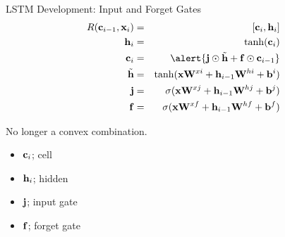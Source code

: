 \documentclass{beamer}
\begin{document}
\begin{frame}{LSTM Development: Input and Forget Gates}
    \begin{eqnarray*}
      R(\boldc_{i-1}, \boldx_i) &=& [\boldc_i, \boldh_i]  \\
      \boldh_i &=& \tanh(\boldc_i) \\ 
      \boldc_i &=& \alert{\boldj \odot \tilde{\boldh}  + \boldf \odot \bold c_{i-1} } \\
      \tilde{\boldh} &=& \tanh(\boldx \boldW^{xi} + \boldh_{i-1}\boldW^{hi} + \boldb^i) \\
      \boldj &=& \sigma(\boldx \boldW^{xj} + \boldh_{i-1}\boldW^{hj} + \boldb^j) \\
      \boldf &=& \sigma(\boldx \boldW^{xf} + \boldh_{i-1}\boldW^{hf} + \boldb^f) \\
    \end{eqnarray*}

    No longer a convex combination.
    \begin{itemize}
    \item $\mathbf{c}_i$; cell
    \item $\mathbf{h}_i$; hidden
    \item $\mathbf{j}$; input gate
    \item $\mathbf{f}$; forget gate
    \end{itemize}
\end{frame}

\end{document}
